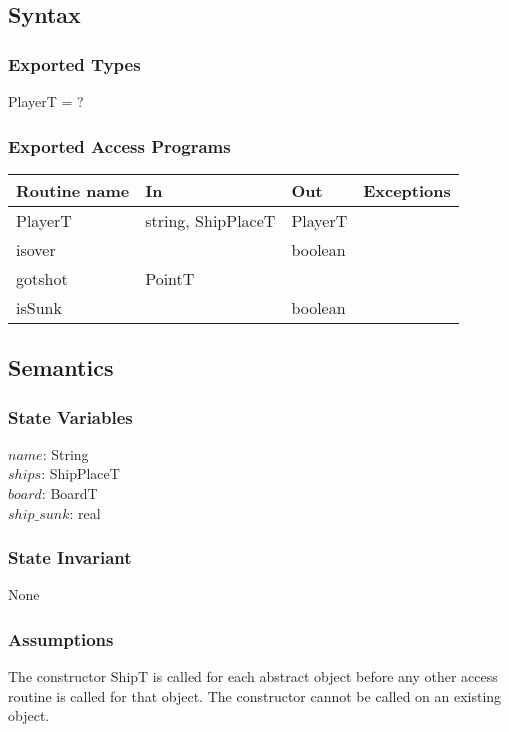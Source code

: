 \documentclass[12pt]{article}
\begin{document}
\subsection* {Syntax}

\subsubsection* {Exported Types}

PlayerT = ?

\subsubsection* {Exported Access Programs}

\begin{tabular}{| l | l | l | l |}
\hline
\textbf{Routine name} & \textbf{In} & \textbf{Out} & \textbf{Exceptions}\\
\hline
PlayerT & string, ShipPlaceT & PlayerT & \\
\hline 
isover &  & boolean &\\
\hline 
gotshot & PointT & &\\
\hline 
isSunk &  & boolean &\\
\hline
\end{tabular}

\subsection* {Semantics}

\subsubsection* {State Variables}

$\mathit{name}$: String \\
$\mathit{ships}$: ShipPlaceT \\
$\mathit{board}$: BoardT \\
$\mathit{ship\_sunk}$: real \\

\subsubsection* {State Invariant}
None

\subsubsection* {Assumptions}
The constructor ShipT is called for each abstract object before any other access routine is called for that
object.  The constructor cannot be called on an existing object.
\end{document}
